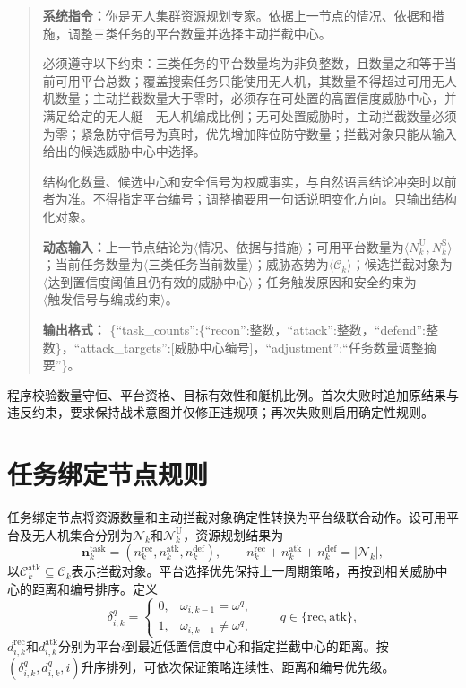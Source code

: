 \begin{quote}\small
\textbf{系统指令：}你是无人集群资源规划专家。依据上一节点的情况、依据和措施，调整三类任务的平台数量并选择主动拦截中心。

必须遵守以下约束：三类任务的平台数量均为非负整数，且数量之和等于当前可用平台总数；覆盖搜索任务只能使用无人机，其数量不得超过可用无人机数量；主动拦截数量大于零时，必须存在可处置的高置信度威胁中心，并满足给定的无人艇—无人机编成比例；无可处置威胁时，主动拦截数量必须为零；紧急防守信号为真时，优先增加阵位防守数量；拦截对象只能从输入给出的候选威胁中心中选择。

结构化数量、候选中心和安全信号为权威事实，与自然语言结论冲突时以前者为准。不得指定平台编号；调整摘要用一句话说明变化方向。只输出结构化对象。

\textbf{动态输入：}上一节点结论为$\langle\text{情况、依据与措施}\rangle$；可用平台数量为$\langle N_k^{\mathrm U},N_k^{\mathrm S}\rangle$；当前任务数量为$\langle\text{三类任务当前数量}\rangle$；威胁态势为$\langle\mathcal C_k\rangle$；候选拦截对象为$\langle\text{达到置信度阈值且仍有效的威胁中心}\rangle$；任务触发原因和安全约束为$\langle\text{触发信号与编成约束}\rangle$。

\textbf{输出格式：}
\{``task\_counts'':\{``recon'':整数，``attack'':整数，``defend'':整数\}，``attack\_targets'':[威胁中心编号]，``adjustment'':``任务数量调整摘要''\}。
\end{quote}

程序校验数量守恒、平台资格、目标有效性和艇机比例。首次失败时追加原结果与违反约束，要求保持战术意图并仅修正违规项；再次失败则启用确定性规则。

\section{任务绑定节点规则}
\label{app:task-binding-rules}

任务绑定节点将资源数量和主动拦截对象确定性转换为平台级联合动作。设可用平台及无人机集合分别为$\mathcal N_k$和$\mathcal N_k^{\mathrm U}$，资源规划结果为
\begin{equation}
    \boldsymbol n_k^{\mathrm{task}}
    =\left(n_k^{\mathrm{rec}},n_k^{\mathrm{atk}},n_k^{\mathrm{def}}\right),
    \qquad
    n_k^{\mathrm{rec}}+n_k^{\mathrm{atk}}+n_k^{\mathrm{def}}
    =|\mathcal N_k|,
    \label{eq:appendix-binding-task-counts}
\end{equation}
以$\mathcal C_k^{\mathrm{atk}}\subseteq\mathcal C_k$表示拦截对象。平台选择优先保持上一周期策略，再按到相关威胁中心的距离和编号排序。定义
\begin{equation}
    \delta_{i,k}^{q}=\begin{cases}
        0,&\omega_{i,k-1}=\omega^q,\\
        1,&\omega_{i,k-1}\neq\omega^q,
    \end{cases}
    \qquad q\in\{\mathrm{rec},\mathrm{atk}\},
    \label{eq:appendix-binding-continuity}
\end{equation}
$d_{i,k}^{\mathrm{rec}}$和$d_{i,k}^{\mathrm{atk}}$分别为平台$i$到最近低置信度中心和指定拦截中心的距离。按$(\delta_{i,k}^{q},d_{i,k}^{q},i)$升序排列，可依次保证策略连续性、距离和编号优先级。

